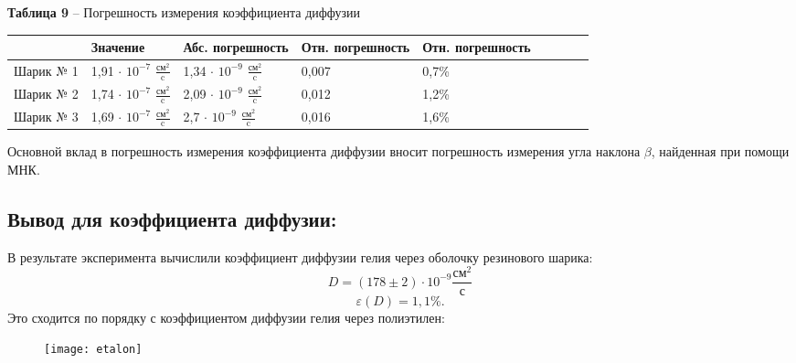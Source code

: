 \documentclass[12pt,a4paper]{article}
\begin{document}
            \begin{table}[!h]
            \begin{flushleft}
                \hspace{10}\textbf{Таблица 9} -- Погрешность измерения коэффициента диффузии \\
                \end{flushleft}
                    \begin{center}
                        \begin{tabular}{ | l | l | l | l | l | l | l | l | l |}
                        \hline
                                    &   Значение    &   Абс. погрешность   &   Отн. погрешность    &   Отн. погрешность \\
                        \hline
                        Шарик № 1   &   1,91 $\cdot$ $10^{-7}$ $\frac{\text{см}^2}{\text{c}}$   &   1,34 $\cdot$ $10^{-9}$ $\frac{\text{см}^2}{\text{c}}$   &   0,007   &   0,7\%               \\
                        \hline
                        Шарик № 2   &   1,74 $\cdot$ $10^{-7}$ $\frac{\text{см}^2}{\text{c}}$   &   2,09 $\cdot$ $10^{-9}$ $\frac{\text{см}^2}{\text{c}}$   &   0,012   &   1,2\%               \\
                        \hline
                        Шарик № 3   &   1,69 $\cdot$ $10^{-7}$ $\frac{\text{см}^2}{\text{c}}$   &   2,7 $\cdot$ $10^{-9}$ $\frac{\text{см}^2}{\text{c}}$   &   0,016   &   1,6\%               \\
                        \hline
                        \end{tabular}
                    \end{center}
                \end{table}  
                
            Основной вклад в погрешность измерения коэффициента диффузии вносит погрешность измерения угла наклона $\beta$, найденная при помощи МНК.
        


            
        
    \subsection{Вывод для коэффициента диффузии:}
        В результате эксперимента вычислили коэффициент диффузии гелия через оболочку резинового шарика:
        \[
        D = (178 \pm 2) \cdot 10 ^{-9}  \frac{\text{см$^2$}}{\text{с}} 
        \]
        \[
        \varepsilon(D) = 1,1\%.
        \]
        Это сходится по порядку с коэффициентом диффузии гелия через полиэтилен:
        \begin{figure}[h!]
        	\begin{center}
        		\texttt{[image: etalon]}\\
            	{\scriptsize
            	\begin{center}
            	\end{center}}
        	\end{center}
            \label{scheme1}
        \end{figure}
        
\end{document}
